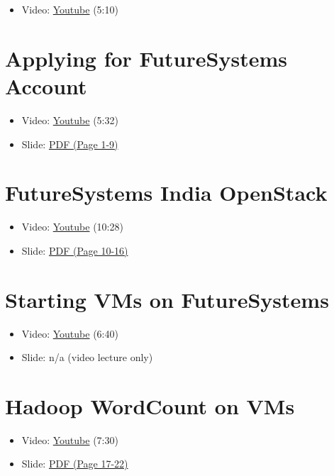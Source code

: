 \begin{itemize}

\item
  Video: \href{https://www.youtube.com/watch?v=zxoqRdvXM28}{Youtube}
  (5:10)
\end{itemize}

\section{Applying for FutureSystems
Account}\label{applying-for-futuresystems-account}

\begin{itemize}

\item
  Video: \href{https://www.youtube.com/watch?v=98ERlWi3k3U}{Youtube}
  (5:32)
\item
  Slide:
  \href{https://drive.google.com/open?id=0B88HKpainTSfZENxeUlOcVFUTkU}{PDF
  (Page 1-9)}
\end{itemize}

\section{FutureSystems India
OpenStack}\label{futuresystems-india-openstack}

\begin{itemize}

\item
  Video: \href{https://www.youtube.com/watch?v=hyKYTpNmJZc}{Youtube}
  (10:28)
\item
  Slide:
  \href{https://drive.google.com/open?id=0B88HKpainTSfZENxeUlOcVFUTkU}{PDF
  (Page 10-16)}
\end{itemize}

\section{Starting VMs on
FutureSystems}\label{starting-vms-on-futuresystems}

\begin{itemize}

\item
  Video: \href{https://www.youtube.com/watch?v=RPnhJs4IcfQ}{Youtube}
  (6:40)
\item
  Slide: n/a (video lecture only)
\end{itemize}

\section{Hadoop WordCount on VMs}\label{hadoop-wordcount-on-vms}

\begin{itemize}

\item
  Video: \href{https://www.youtube.com/watch?v=1TrjmcPHrRU}{Youtube}
  (7:30)
\item
  Slide:
  \href{https://drive.google.com/open?id=0B88HKpainTSfZENxeUlOcVFUTkU}{PDF
  (Page 17-22)}
\end{itemize}
